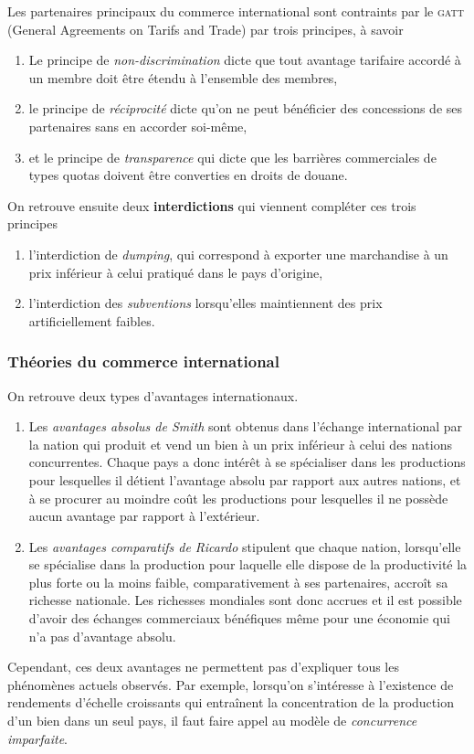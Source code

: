 Les partenaires principaux du commerce international sont contraints par le
\textsc{gatt} (General Agreements on Tarifs and Trade) par trois principes,
à savoir
\begin{enumerate}
  \item Le principe de \emph{non-discrimination} dicte que tout avantage tarifaire accordé
  à un membre doit être étendu à l'ensemble des membres,
  \item le principe de \emph{réciprocité} dicte qu'on ne peut bénéficier des concessions
  de ses partenaires sans en accorder soi-même,
  \item et le principe de \emph{transparence} qui dicte que les barrières commerciales de
  types quotas doivent être converties en droits de douane.
\end{enumerate}
On retrouve ensuite deux \textbf{interdictions} qui viennent compléter ces trois principes
\begin{enumerate}
  \item l'interdiction de \emph{dumping}, qui correspond à  exporter une marchandise 
  à un prix inférieur à celui pratiqué dans le pays d'origine,
  \item l'interdiction des \emph{subventions} lorsqu'elles maintiennent des prix
  artificiellement faibles.
\end{enumerate}


\subsubsection{Théories du commerce international} %
\label{ssub:theories_du_commerce_international}
On retrouve deux types d'avantages internationaux.
\begin{enumerate}
  \item Les \emph{avantages absolus de Smith} sont obtenus dans l'échange
  international par la nation qui produit et vend un bien à un prix inférieur
  à celui des nations concurrentes.
  Chaque pays a donc intérêt à se spécialiser dans les productions pour lesquelles
  il détient l'avantage absolu par rapport aux autres nations,
  et à se procurer au moindre coût les productions pour lesquelles 
  il ne possède aucun avantage par rapport à l'extérieur.
  \item Les \emph{avantages comparatifs de Ricardo} stipulent que chaque nation,
  lorsqu'elle se spécialise dans la production pour laquelle elle dispose de la 
  productivité la plus forte ou la moins faible, comparativement à ses partenaires,
  accroît sa richesse nationale. Les richesses mondiales sont donc accrues 
  et il est possible d'avoir des échanges commerciaux bénéfiques même pour 
  une économie qui n'a pas d'avantage absolu.
\end{enumerate}
Cependant, ces deux avantages ne permettent pas d'expliquer tous les phénomènes
actuels observés.
Par exemple, lorsqu'on s'intéresse à l'existence de rendements d'échelle
croissants qui entraînent la concentration de la production d'un bien 
dans un seul pays, il faut faire appel au modèle de \emph{concurrence imparfaite}.

